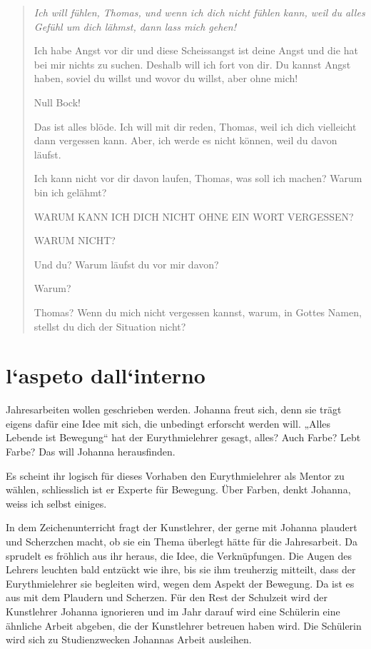 \documentclass[10pt,titlepage,a5paper]{book}
\newenvironment{tg}{\begin{quote}\em}{\end{quote}}
\begin{document}
\begin{tg}
Ich will fühlen, Thomas, und wenn ich dich nicht fühlen kann, weil du alles Gefühl um dich lähmst, dann lass mich gehen!

Ich habe Angst vor dir und diese Scheissangst ist deine Angst und die hat bei mir nichts zu suchen. Deshalb will ich fort von dir. Du kannst Angst haben, soviel du willst und wovor du willst, aber ohne mich!

Null Bock!

Das ist alles blöde. Ich will mit dir reden, Thomas, weil ich dich vielleicht dann vergessen kann. Aber, ich werde es nicht können, weil du davon läufst.

Ich kann nicht vor dir davon laufen, Thomas, was soll ich machen?
Warum bin ich gelähmt?

WARUM KANN ICH DICH NICHT OHNE EIN WORT VERGESSEN? 

WARUM NICHT?

Und du? Warum läufst du vor mir davon?

 Warum?
 
Thomas? Wenn du mich nicht vergessen kannst, warum, in Gottes Namen, stellst  du dich der Situation nicht?
\end{tg}


\section*{l`aspeto dall`interno }


Jahresarbeiten wollen geschrieben werden. Johanna freut sich, denn sie trägt eigens dafür eine Idee mit sich, die unbedingt erforscht werden will. „Alles Lebende ist Bewegung“ hat der Eurythmielehrer gesagt, alles? Auch Farbe? Lebt Farbe? Das will Johanna herausfinden.

Es scheint ihr logisch für dieses Vorhaben den Eurythmielehrer als Mentor zu wählen, schliesslich ist er Experte für Bewegung. Über Farben, denkt Johanna, weiss ich selbst einiges.  

In dem Zeichenunterricht fragt der Kunstlehrer, der gerne mit Johanna plaudert und Scherzchen macht, ob sie ein Thema überlegt hätte für die Jahresarbeit. Da sprudelt es fröhlich aus ihr heraus, die Idee, die Verknüpfungen. Die Augen des Lehrers leuchten bald entzückt wie ihre, bis sie ihm treuherzig mitteilt, dass der Eurythmielehrer sie begleiten wird, wegen dem Aspekt der Bewegung. Da ist es aus mit dem Plaudern und Scherzen. Für den Rest der Schulzeit wird der Kunstlehrer Johanna ignorieren und im Jahr darauf wird eine Schülerin eine ähnliche Arbeit abgeben, die der Kunstlehrer betreuen haben wird. Die Schülerin wird sich zu Studienzwecken Johannas Arbeit ausleihen.
\end{document}

